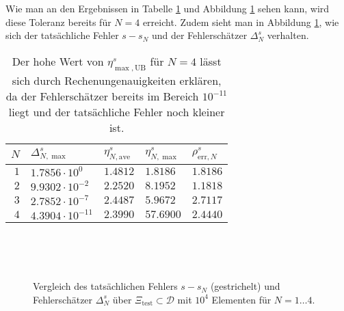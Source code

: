 Wie man an den Ergebnissen in Tabelle \ref{tab:eindim} und Abbildung \ref{fig:plot_s_fehler} sehen kann, wird diese Toleranz bereits für $N = 4$ erreicht.
Zudem sieht man in Abbildung \ref{fig:plot_s_fehler}, wie sich der tatsächliche Fehler $s - s_N$ und der Fehlerschätzer $\Delta^s_N$ verhalten.

\begin{table}[h!]
    \begin{center}
    \small
        \begin{tabular}{r|llll}
        $N$ & $\Delta^s_{N,\max}$ & $\eta^s_{N,\text{ave}}$ & $\eta^s_{N,\max}$ & $\rho^s_{\text{err}, N}$ \\
        \hline
            $1$ & $1.7856 \cdot 10^{0}$ & $1.4812$ & $1.8186$ & $1.8186$ \\
            $2$ & $9.9302 \cdot 10^{-2}$ & $2.2520$ & $8.1952$ & $1.1818$ \\
            $3$ & $2.7852 \cdot 10^{-7}$ & $2.4487$ & $5.9672$ & $2.7117$ \\
            $4$ & $4.3904 \cdot 10^{-11}$ & $2.3990$ & $57.6900$ & $2.4440$ \\
        \end{tabular}
        \caption{Der hohe Wert von $\eta^s_{\max,\text{UB}}$ für $N = 4$ lässt sich durch Rechenungenauigkeiten erklären, da der Fehlerschätzer bereits im Bereich $10^{-11}$ liegt und der tatsächliche Fehler noch kleiner ist.}
        \label{tab:eindim}
    \end{center}
\end{table}

\begin{figure}[h!]
    \begin{center}
        \tiny
        \newlength\figureheight
        \newlength\figurewidth
        \setlength\figureheight{4cm}
        \setlength{}
        \begin{subfigure}[b]{0.45\textwidth}
            ~
            
        \end{subfigure}
        \hfill
        \begin{subfigure}[b]{0.45\textwidth}
            ~
            
        \end{subfigure}

        \begin{subfigure}[b]{0.45\textwidth}
            
        \end{subfigure}
        \hfill
        \begin{subfigure}[b]{0.45\textwidth}
            
        \end{subfigure}
    \end{center}
    \caption{
    Vergleich des tatsächlichen Fehlers $s - s_N$ (gestrichelt) und Fehlerschätzer $\Delta^s_N$ über $\Xi_\text{test} \subset \mathcal D$ mit $10^4$ Elementen für $N = 1 \ldots 4$.}
    \label{fig:plot_s_fehler}
\end{figure}

